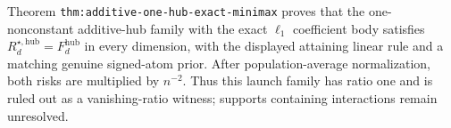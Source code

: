 Theorem \texttt{thm:additive-one-hub-exact-minimax} proves that the one-nonconstant additive-hub family with the exact \(\ell_1\) coefficient body satisfies \(R_d^{\star,\mathrm{hub}}=F_d^{\mathrm{hub}}\) in every dimension, with the displayed attaining linear rule and a matching genuine signed-atom prior.  After population-average normalization, both risks are multiplied by \(n^{-2}\).  Thus this launch family has ratio one and is ruled out as a vanishing-ratio witness; supports containing interactions remain unresolved.